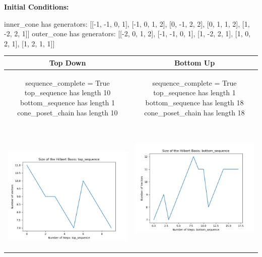 \documentclass[10pt]{article}
\begin{document}
\textbf{Initial Conditions:}
\begin{SAGE}
inner_cone has generators: 
[[-1, -1, 0, 1], [-1, 0, 1, 2], [0, -1, 2, 2], [0, 1, 1, 2], [1, -2, 2, 1]]
outer_cone has generators: 
[[-2, 0, 1, 2], [-1, -1, 0, 1], [1, -2, 2, 1], [1, 0, 2, 1], [1, 2, 1, 1]]

\end{SAGE}
\begin{tabular}{c|c}
\textbf{Top Down} & \textbf{Bottom Up} \\ \hline  
\begin{SAGE}
	sequence_complete = True
	top_sequence has length 10
	bottom_sequence has length 1
	cone_poset_chain has length 10
\end{SAGE} 
&
\begin{SAGE}
	sequence_complete = True
	top_sequence has length 1
	bottom_sequence has length 18
	cone_poset_chain has length 18
\end{SAGE} 
\\ \hline
\
\begin{minipage}{.45\textwidth}
\includegraphics[width=\textwidth]{"DATA/4d/5 generators 2 bound C/top_sequence SIZE"}
\end{minipage} &
\begin{minipage}{.45\textwidth}
\includegraphics[width=\textwidth]{"DATA/4d/5 generators 2 bound C bottomup/bottom_sequence SIZE"}

\end{minipage}
\end{tabular}
\end{document}
